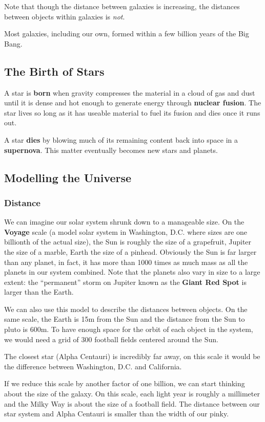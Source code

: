 \documentclass[12pt]{article}
\begin{document}
Note that though the distance between galaxies is increasing, the distances between objects within galaxies is \emph{not}.

Most galaxies, including our own, formed within a few billion years of the Big Bang.

\subsection{The Birth of Stars}
A star is {\bf born} when gravity compresses the material in a cloud of gas and dust until it is dense and hot enough to generate energy through {\bf nuclear fusion}. The star lives so long as it has useable material to fuel its fusion and dies once it runs out.

A star {\bf dies} by blowing much of its remaining content back into space in a {\bf supernova}. This matter eventually becomes new stars and planets.

\subsection{Modelling the Universe}
\subsubsection{Distance}
We can imagine our solar system shrunk down to a manageable size. On the {\bf Voyage} scale (a model solar system in Washington, D.C. where sizes are one billionth of the actual size), the Sun is roughly the size of a grapefruit, Jupiter the size of a marble, Earth the size of a pinhead. Obviously the Sun is far larger than any planet, in fact, it has more than 1000 times as much mass as all the planets in our system combined. Note that the planets also vary in size to a large extent: the ``permanent'' storm on Jupiter known as the {\bf Giant Red Spot} is larger than the Earth.

We can also use this model to describe the distances between objects. On the same scale, the Earth is 15m from the Sun and the distance from the Sun to pluto is 600m. To have enough space for the orbit of each object in the system, we would need a grid of 300 football fields centered around the Sun.

The closest star (Alpha Centauri) is incredibly far away, on this scale it would be the difference between Washington, D.C. and California.

If we reduce this scale by another factor of one billion, we can start thinking about the size of the galaxy. On this scale, each light year is roughly a millimeter and the Milky Way is about the size of a football field. The distance between our star system and Alpha Centauri is smaller than the width of our pinky.
\end{document}
